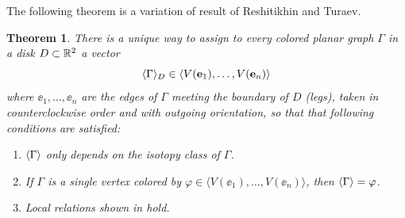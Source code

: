 \documentclass{ws-jktr}
\newtheorem{thm}{Theorem}[section]
\newcommand{\Ga}{\Gamma}
\newcommand{\ph}{\varphi}
\begin{document}
The following theorem is a variation of result of Reshitikhin and Turaev. 
\begin{thm}\label{t:RT}
  There is a unique  way to assign to every colored
  planar graph $\Ga$ in a disk $D\subset \mathbb{R}^2$ a vector
  \begin{equation}
    \<\Ga\>_D\in \langle V(\ee_1), \dots, V(\ee_n) \rangle
  \end{equation}
  where $\ee_1,\dots, \ee_n$ are the edges of $\Ga$ meeting the boundary
  of $D$ (legs), taken in counterclockwise order and with outgoing orientation,
  so that that following conditions are satisfied:
  \begin{enumerate}
     \item $\<\Ga\>$ only depends on the isotopy  class of $\Ga$.

    \item If $\Ga$ is a single vertex colored by
          $\ph\in \langle V(\ee_1), \dots,  V(\ee_n)\rangle$, then $\<\Ga\>=\ph$.
     
    \item Local relations shown in  hold. 



\end{enumerate}
\end{thm}
\end{document}
